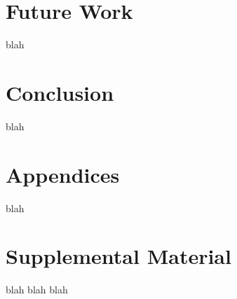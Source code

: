 \documentclass[11pt,a4paper]{article}
\begin{document}
\section{Future Work}

blah

\section{Conclusion}

blah




\appendix

\section{Appendices}
\label{sec:appendix}

blah 

\section{Supplemental Material}
\label{sec:supplemental}
blah blah blah
\end{document}
